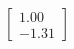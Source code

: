 \documentclass[preview]{standalone}
\begin{document}
\begin{align*}
\begin{bmatrix} 1.00 \\ -1.31 \end{bmatrix}
\end{align*}
\end{document}
